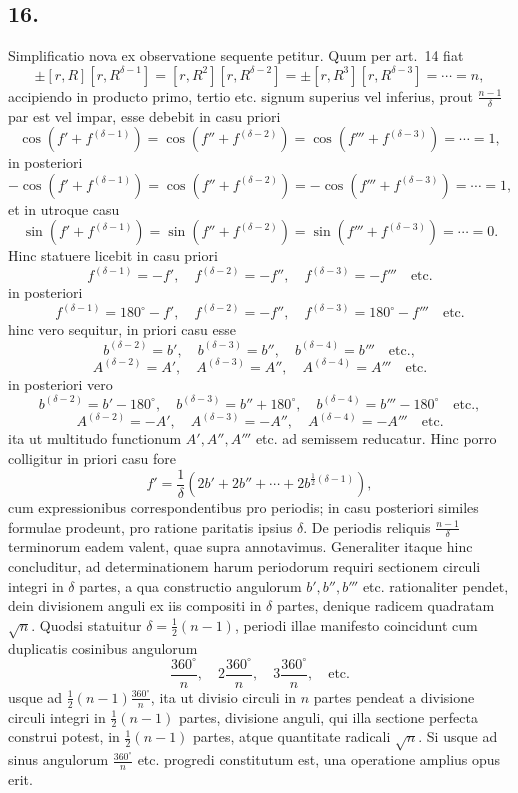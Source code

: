 \documentclass[12pt]{article}
\begin{document}
\subsection*{16.}

Simplificatio nova ex observatione sequente petitur. Quum per art.~14 fiat
\[
\pm [r,R][r,R^{\delta-1}]=[r,R^2][r,R^{\delta-2}]=\pm[r,R^3][r,R^{\delta-3}]=\cdots=n,
\]
accipiendo in producto primo, tertio etc. signum superius vel inferius, prout $\frac{n-1}{\delta}$ par est vel impar, esse debebit in casu priori
\[
\cos(f'+f^{(\delta-1)})=\cos(f''+f^{(\delta-2)})=\cos(f'''+f^{(\delta-3)})=\cdots=1,
\]
in posteriori
\[
-\cos(f'+f^{(\delta-1)})=\cos(f''+f^{(\delta-2)})=-\cos(f'''+f^{(\delta-3)})=\cdots=1,
\]
et in utroque casu
\[
\sin(f'+f^{(\delta-1)})=\sin(f''+f^{(\delta-2)})=\sin(f'''+f^{(\delta-3)})=\cdots=0.
\]
Hinc statuere licebit in casu priori
\[
f^{(\delta-1)}=-f',\quad f^{(\delta-2)}=-f'',\quad f^{(\delta-3)}=-f'''\quad\text{etc.}
\]
in posteriori
\[
f^{(\delta-1)}=180^\circ-f',\quad f^{(\delta-2)}=-f'',\quad
f^{(\delta-3)}=180^\circ-f'''\quad\text{etc.}
\]
hinc vero sequitur, in priori casu esse
\[
b^{(\delta-2)}=b',\quad b^{(\delta-3)}=b'',\quad b^{(\delta-4)}=b'''\quad\text{etc.},
\]
\[
A^{(\delta-2)}=A',\quad A^{(\delta-3)}=A'',\quad A^{(\delta-4)}=A'''\quad\text{etc.}
\]
in posteriori vero
\[
b^{(\delta-2)}=b'-180^\circ,\quad b^{(\delta-3)}=b''+180^\circ,\quad
b^{(\delta-4)}=b'''-180^\circ\quad\text{etc.},
\]
\[
A^{(\delta-2)}=-A',\quad A^{(\delta-3)}=-A'',\quad A^{(\delta-4)}=-A'''\quad\text{etc.}
\]
ita ut multitudo functionum $A',A'',A'''$ etc. ad semissem reducatur. Hinc porro colligitur in priori casu fore
\[
f'=\frac1\delta(2b'+2b''+\cdots+2b^{\frac12(\delta-1)}),
\]
cum expressionibus correspondentibus pro periodis; in casu posteriori similes formulae prodeunt, pro ratione paritatis ipsius $\delta$. De periodis reliquis $\frac{n-1}{\delta}$ terminorum eadem valent, quae supra annotavimus. Generaliter itaque hinc concluditur, ad determinationem harum periodorum requiri sectionem circuli integri in $\delta$ partes, a qua constructio angulorum $b',b'',b'''$ etc. rationaliter pendet, dein divisionem anguli ex iis compositi in $\delta$ partes, denique radicem quadratam $\sqrt n$. Quodsi statuitur $\delta=\frac12(n-1)$, periodi illae manifesto coincidunt cum duplicatis cosinibus angulorum
\[
\frac{360^\circ}{n},\quad 2\frac{360^\circ}{n},\quad 3\frac{360^\circ}{n},\quad\text{etc.}
\]
usque ad $\frac12(n-1)\frac{360^\circ}{n}$, ita ut divisio circuli in $n$ partes pendeat a divisione circuli integri in $\frac12(n-1)$ partes, divisione anguli, qui illa sectione perfecta construi potest, in $\frac12(n-1)$ partes, atque quantitate radicali $\sqrt n$. Si usque ad sinus angulorum $\frac{360^\circ}{n}$ etc. progredi constitutum est, una operatione amplius opus erit.
\end{document}
